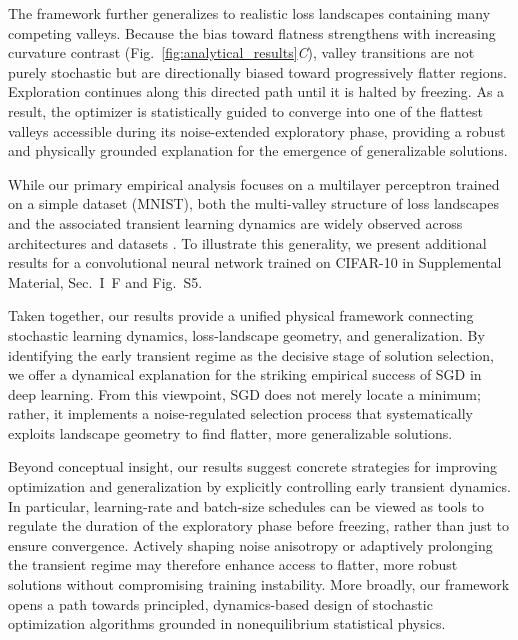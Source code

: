 \documentclass[aps,prx,reprint,superscriptaddress,longbibliography,nofootinbib,floatfix]{revtex4-2}
\begin{document}
The framework further generalizes to realistic loss landscapes containing many competing valleys. Because the bias toward flatness strengthens with increasing curvature contrast (Fig.~\ref{fig:analytical_results}\textit{C}), valley transitions are not purely stochastic but are directionally biased toward progressively flatter regions. Exploration continues along this directed path until it is halted by freezing. As a result, the optimizer is statistically guided to converge into one of the flattest valleys accessible during its noise-extended exploratory phase, providing a robust and physically grounded explanation for the emergence of generalizable solutions.

While our primary empirical analysis focuses on a multilayer perceptron trained on a simple dataset (MNIST), both the multi-valley structure of loss landscapes and the associated transient learning dynamics are widely observed across architectures and datasets \cite{fortLargeScaleStructure2019,garipovLossSurfacesMode2018,achilleCriticalLearningPeriods2019,jastrzebskiBreakEvenPointOptimization2020,kalraPhaseDiagramEarly2023}. To illustrate this generality, we present additional results for a convolutional neural network trained on CIFAR-10 in Supplemental Material, Sec.~I~F and Fig.~S5.

Taken together, our results provide a unified physical framework connecting stochastic learning dynamics, loss-landscape geometry, and generalization. By identifying the early transient regime as the decisive stage of solution selection, we offer a dynamical explanation for the striking empirical success of SGD in deep learning. From this viewpoint, SGD does not merely locate a minimum; rather, it implements a noise-regulated selection process that systematically exploits landscape geometry to find flatter, more generalizable solutions.

Beyond conceptual insight, our results suggest concrete strategies for improving optimization and generalization by explicitly controlling early transient dynamics. In particular, learning-rate and batch-size schedules can be viewed as tools to regulate the duration of the exploratory phase before freezing, rather than just to ensure convergence. Actively shaping noise anisotropy or adaptively prolonging the transient regime may therefore enhance access to flatter, more robust solutions without compromising training instability. More broadly, our framework opens a path towards principled, dynamics-based design of stochastic optimization algorithms grounded in nonequilibrium statistical physics.
\end{document}
